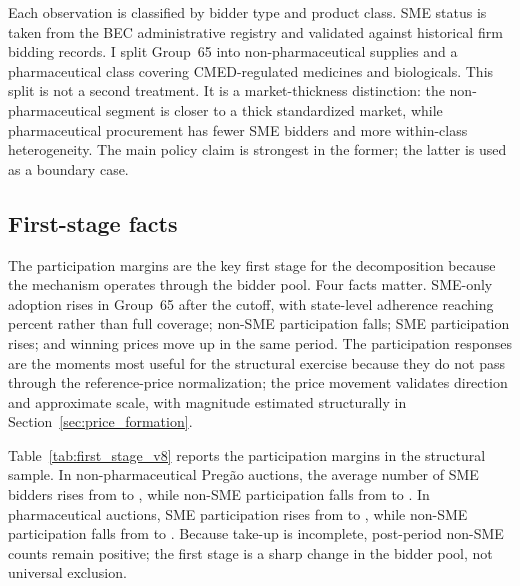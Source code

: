 Each observation is classified by bidder type and product class. SME
status is taken from the BEC administrative registry and validated against
historical firm bidding records. I split Group~65 into non-pharmaceutical
supplies and a pharmaceutical class covering CMED-regulated medicines and
biologicals. This split is not a second treatment. It is a
market-thickness distinction: the non-pharmaceutical segment is closer to
a thick standardized market, while pharmaceutical procurement has fewer
SME bidders and more within-class heterogeneity. The main policy claim is
strongest in the former; the latter is used as a boundary case.

\subsection{First-stage facts}

The participation margins are the key first stage for the decomposition
because the mechanism operates through the bidder pool. Four facts matter.
SME-only adoption rises in Group~65 after the cutoff, with state-level
adherence reaching \adherenceGsixtyfivePost{} percent rather than full
coverage; non-SME participation falls; SME participation rises; and winning
prices move up in the same period. The participation responses are the
moments most useful for the structural exercise because they do not pass
through the reference-price normalization; the price movement validates
direction and approximate scale, with magnitude estimated structurally in
Section~\ref{sec:price_formation}.

Table~\ref{tab:first_stage_v8} reports the participation margins in the
structural sample. In non-pharmaceutical Preg\~ao auctions, the average
number of SME bidders rises from \bneNsmePreNp{} to \bneNsmePostNp{},
while non-SME participation falls from \bneNnsPreNp{} to \nonSmePostNp{}.
In pharmaceutical auctions, SME participation rises from \bneNsmePrePh{}
to \bneNsmePostPh{}, while non-SME participation falls from
\bneNnsPrePh{} to \nonSmePostPh{}. Because take-up is incomplete,
post-period non-SME counts remain positive; the first stage is a sharp
change in the bidder pool, not universal exclusion.

